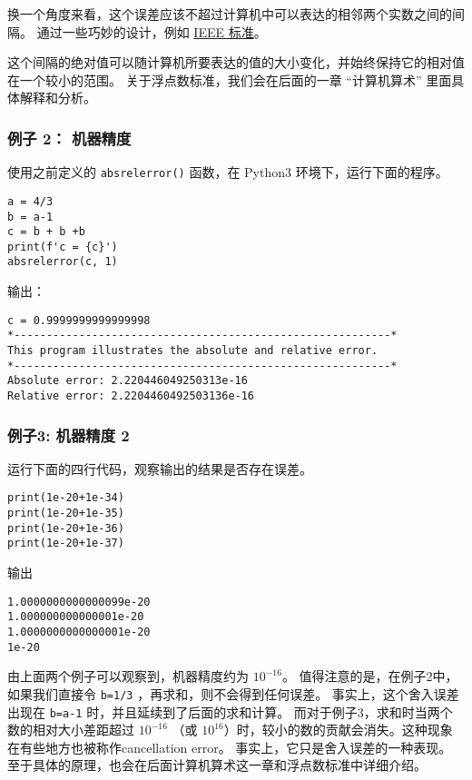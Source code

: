 换一个角度来看，这个误差应该不超过计算机中可以表达的相邻两个实数之间的间隔。 通过一些巧妙的设计，例如 \href{https://ieeexplore.ieee.org/document/8766229}{IEEE 标准}。

这个间隔的绝对值可以随计算机所要表达的值的大小变化，并始终保持它的相对值在一个较小的范围。 关于浮点数标准，我们会在后面的一章 “计算机算术” 里面具体解释和分析。

\subsubsection{例子 2： 机器精度}

使用之前定义的 \verb|absrelerror()| 函数，在 Python3 环境下，运行下面的程序。
\begin{lstlisting}[language={}]
a = 4/3
b = a-1
c = b + b +b
print(f'c = {c}')
absrelerror(c, 1)
\end{lstlisting}

输出：
\begin{lstlisting}[language={}]
c = 0.9999999999999998
*----------------------------------------------------------*
This program illustrates the absolute and relative error.
*----------------------------------------------------------*
Absolute error: 2.220446049250313e-16
Relative error: 2.2204460492503136e-16
\end{lstlisting}

\subsubsection{例子3: 机器精度 2}
运行下面的四行代码，观察输出的结果是否存在误差。
\begin{lstlisting}[language={}]
print(1e-20+1e-34)
print(1e-20+1e-35)
print(1e-20+1e-36)
print(1e-20+1e-37)
\end{lstlisting}
输出
\begin{lstlisting}[language={}]
1.0000000000000099e-20
1.000000000000001e-20
1.0000000000000001e-20
1e-20
\end{lstlisting}

由上面两个例子可以观察到，机器精度约为  $10^{-16}$。 值得注意的是，在例子2中， 如果我们直接令 \verb|b=1/3| ，再求和，则不会得到任何误差。 事实上，这个舍入误差出现在 \verb|b=a-1| 时，并且延续到了后面的求和计算。 而对于例子3，求和时当两个数的相对大小差距超过  $10^{-16}$  （或  $10^{16}$）时，较小的数的贡献会消失。这种现象在有些地方也被称作cancellation error。 事实上，它只是舍入误差的一种表现。 至于具体的原理，也会在后面计算机算术这一章和浮点数标准中详细介绍。


